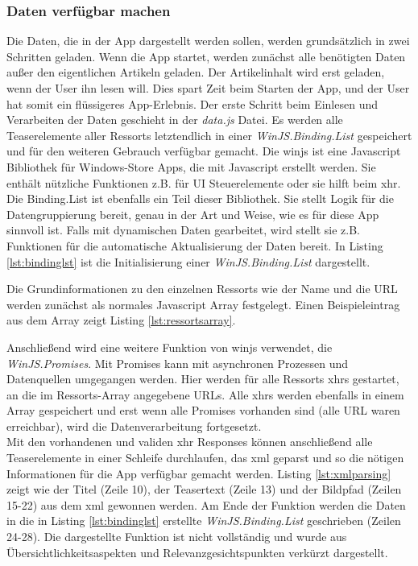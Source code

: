\documentclass[12pt,a4paper,bibtotoc,abstracton]{scrartcl}
\begin{document}
\subsubsection{Daten verfügbar machen}
\label{subsubsec:datenverfügbarmachen}
Die Daten, die in der App dargestellt werden sollen, werden grundsätzlich in zwei Schritten geladen. Wenn die App startet, werden zunächst alle benötigten Daten außer den eigentlichen Artikeln geladen. Der Artikelinhalt wird erst geladen, wenn der User ihn lesen will. Dies spart Zeit beim Starten der App, und der User hat somit ein flüssigeres App-Erlebnis. Der erste Schritt beim Einlesen und Verarbeiten der Daten geschieht in der \textit{data.js} Datei. Es werden alle Teaserelemente aller Ressorts letztendlich in einer  \textit{WinJS.Binding.List} gespeichert und für den weiteren Gebrauch verfügbar gemacht. Die \ac{winjs} ist eine Javascript Bibliothek für Windows-Store Apps, die mit Javascript erstellt werden. Sie enthält nützliche Funktionen z.B. für UI Steuerelemente oder sie hilft beim \ac{xhr}. Die Binding.List ist ebenfalls ein Teil dieser Bibliothek. Sie stellt Logik für die Datengruppierung bereit, genau in der Art und Weise, wie es für diese App sinnvoll ist. Falls mit dynamischen Daten gearbeitet, wird stellt sie z.B. Funktionen für die automatische Aktualisierung der Daten bereit. In Listing \ref{lst:bindinglst} ist die Initialisierung einer \textit{WinJS.Binding.List} dargestellt.

\begin{minipage}{\linewidth}

\end{minipage}

Die Grundinformationen zu den einzelnen Ressorts wie der Name und die URL werden zunächst als normales Javascript Array festgelegt. Einen Beispieleintrag aus dem Array zeigt Listing \ref{lst:ressortsarray}.

\begin{minipage}{\linewidth}

\end{minipage}

Anschließend wird eine weitere Funktion von \ac{winjs} verwendet, die \textit{WinJS.Promises}. Mit Promises kann mit asynchronen Prozessen und Datenquellen umgegangen werden. Hier werden für alle Ressorts \ac{xhr}s gestartet, an die im Ressorts-Array angegebene URLs. Alle \ac{xhr}s werden ebenfalls in einem Array gespeichert und erst wenn alle Promises vorhanden sind (alle URL waren erreichbar), wird die Datenverarbeitung fortgesetzt. \\
Mit den vorhandenen und validen \ac{xhr} Responses können anschließend alle Teaserelemente in einer Schleife durchlaufen, das \ac{xml} geparst und so die nötigen Informationen für die App verfügbar gemacht werden. Listing \ref{lst:xmlparsing} zeigt wie der Titel (Zeile 10), der Teasertext (Zeile 13) und der Bildpfad (Zeilen 15-22) aus dem \ac{xml} gewonnen werden. Am Ende der Funktion werden die Daten in die in Listing \ref{lst:bindinglst} erstellte \textit{WinJS.Binding.List} geschrieben (Zeilen 24-28). Die dargestellte Funktion ist nicht vollständig und wurde aus Übersichtlichkeitsaspekten und Relevanzgesichtspunkten verkürzt dargestellt.
\end{document}
